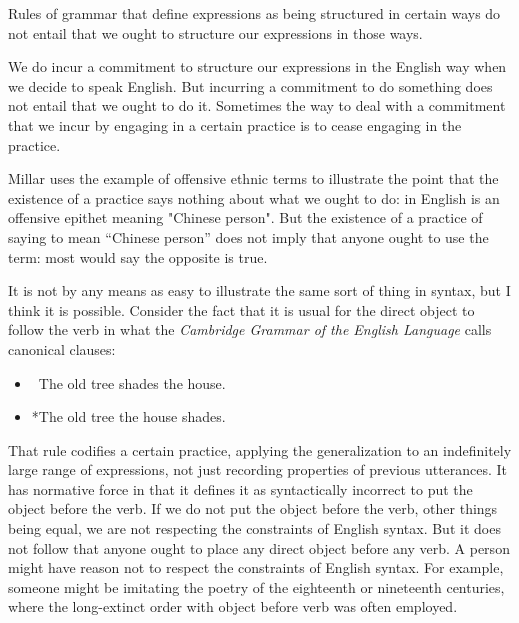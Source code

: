 \documentclass[output=paper]{langscibook}
\begin{document}
Rules of grammar that define expressions as being structured in certain ways do not entail that we ought to structure our expressions in those ways.

We do incur a commitment to structure our expressions in the English way when we decide to speak English.  But incurring a commitment to do something does not entail that we ought to do it.  Sometimes the way to deal with a commitment that we incur by engaging in a certain practice is to cease engaging in the practice.

Millar uses the example of offensive ethnic terms to illustrate the point that the existence of a practice says nothing about what we ought to do:  in English is an offensive epithet meaning "Chinese person". But the existence of a practice of saying  to mean ``Chinese person'' does not imply that anyone ought to use the term: most would say the opposite is true.

It is not by any means as easy to illustrate the same sort of thing in syntax, but I think it is possible.  Consider the fact that it is usual for the direct object to follow the verb in what the \emph{Cambridge Grammar of the English Language} \citep{HuddlestonePullum2008} calls canonical clauses:

\begin{itemize}  
\item[] ~The old tree shades the house.  
\item[] *The old tree the house shades. 
\end{itemize} 

That rule codifies a certain practice, applying the generalization to an indefinitely large range of expressions, not just recording properties of previous utterances.  It has normative force in that it defines it as syntactically incorrect to put the object before the verb.  If we do not put the object before the verb, other things being equal, we are not respecting the constraints of English syntax.  But it does not follow that anyone ought to place any direct object before any verb.  A person might have reason not to respect the constraints of English syntax.  For example, someone might be imitating the poetry of the eighteenth or nineteenth centuries, where the long-extinct order with object before verb was often employed.
\end{document}
